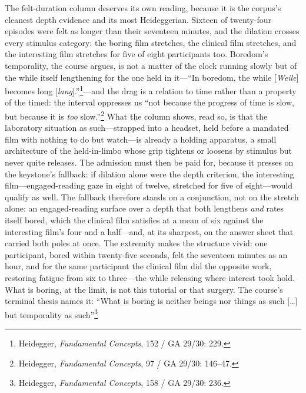 The felt-duration column deserves its own reading, because it is the corpus's cleanest depth evidence and its most Heideggerian. Sixteen of twenty-four episodes were felt as longer than their seventeen minutes, and the dilation crosses every stimulus category: the boring film stretches, the clinical film stretches, and the interesting film stretches for five of eight participants too. Boredom's temporality, the course argues, is not a matter of the clock running slowly but of the while itself lengthening for the one held in it---``In boredom, the while [\textit{Weile}] becomes long [\textit{lang}].''\footnote{Heidegger, \textit{Fundamental Concepts}, 152 / GA 29/30: 229.}---and the drag is a relation to time rather than a property of the timed: the interval oppresses us ``not because the progress of time is slow, but because it is \textit{too} slow.''\footnote{Heidegger, \textit{Fundamental Concepts}, 97 / GA 29/30: 146--47.} What the column shows, read so, is that the laboratory situation as such---strapped into a headset, held before a mandated film with nothing to do but watch---is already a holding apparatus, a small architecture of the held-in-limbo whose grip tightens or loosens by stimulus but never quite releases. The admission must then be paid for, because it presses on the keystone's fallback: if dilation alone were the depth criterion, the interesting film---engaged-reading gaze in eight of twelve, stretched for five of eight---would qualify as well. The fallback therefore stands on a conjunction, not on the stretch alone: an engaged-reading surface over a depth that both lengthens \textit{and} rates itself bored, which the clinical film satisfies at a mean of six against the interesting film's four and a half---and, at its sharpest, on the answer sheet that carried both poles at once. The extremity makes the structure vivid: one participant, bored within twenty-five seconds, felt the seventeen minutes as an hour, and for the same participant the clinical film did the opposite work, restoring fatigue from six to three---the while releasing where interest took hold. What is boring, at the limit, is not this tutorial or that surgery. The course's terminal thesis names it: ``What is boring is neither beings nor things as such [\ldots] but temporality as such''\footnote{Heidegger, \textit{Fundamental Concepts}, 158 / GA 29/30: 236.}

